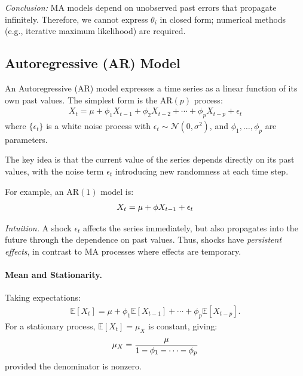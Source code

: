 \documentclass[10pt,a4paper]{article}
\begin{document}
	\textit{Conclusion:} 
	MA models depend on unobserved past errors that propagate infinitely. Therefore, we cannot express $\theta_i$ in closed form; numerical methods (e.g., iterative maximum likelihood) are required.
	
	
	\subsection{Autoregressive (AR) Model}
	An Autoregressive (AR) model expresses a time series as a linear function of its own past values. The simplest form is the AR$(p)$ process:
	\begin{align*}
	X_t = \mu + \phi_1 X_{t-1} + \phi_2 X_{t-2} + \cdots + \phi_p X_{t-p} + \epsilon_t
	\end{align*}
	where $\{\epsilon_t\}$ is a white noise process with $\epsilon_t \sim \mathcal{N}(0,\sigma^2)$, and $\phi_1,\dots,\phi_p$ are parameters.
	
	The key idea is that the current value of the series depends directly on its past values, with the noise term $\epsilon_t$ introducing new randomness at each time step.
	
	For example, an AR$(1)$ model is:
	\begin{align*}
	\large X_t = \mu + \phi X_{t-1} + \epsilon_t
	\end{align*}
	
	\textit{Intuition.} A shock $\epsilon_t$ affects the series immediately, but also propagates into the future through the dependence on past values. Thus, shocks have \textit{persistent effects}, in contrast to MA processes where effects are temporary.
	
	\paragraph{Mean and Stationarity.} Taking expectations:
	\begin{align*}
	\mathbb{E}[X_t] = \mu + \phi_1 \mathbb{E}[X_{t-1}] + \cdots + \phi_p \mathbb{E}[X_{t-p}].
	\end{align*}
	For a stationary process, $\mathbb{E}[X_t] = \mu_X$ is constant, giving:
	\begin{align*}
	\large \mu_X = \frac{\mu}{1 - \phi_1 - \cdots - \phi_p}
	\end{align*}
	provided the denominator is nonzero.
	
\end{document}
